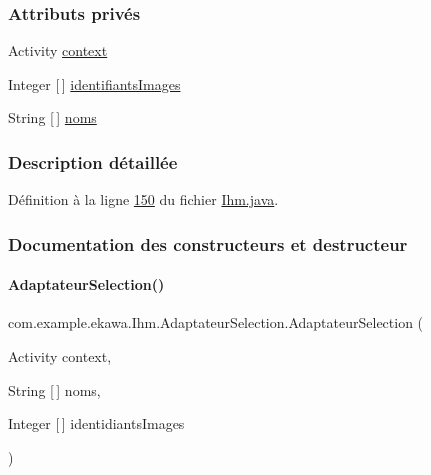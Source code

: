 \subsubsection*{Attributs privés}
\begin{DoxyCompactItemize}
\item 
Activity \hyperlink{classcom_1_1example_1_1ekawa_1_1_ihm_1_1_adaptateur_selection_a9605d2f9384114fcb57da610a7071676}{context}
\item 
Integer \mbox{[}$\,$\mbox{]} \hyperlink{classcom_1_1example_1_1ekawa_1_1_ihm_1_1_adaptateur_selection_ac242f0e242c82c556fb9bba16a5207d1}{identifiants\+Images}
\item 
String \mbox{[}$\,$\mbox{]} \hyperlink{classcom_1_1example_1_1ekawa_1_1_ihm_1_1_adaptateur_selection_a5d71a6dd60ad53aa95ae59bb094b4002}{noms}
\end{DoxyCompactItemize}


\subsubsection{Description détaillée}


Définition à la ligne \hyperlink{_ihm_8java_source_l00150}{150} du fichier \hyperlink{_ihm_8java_source}{Ihm.\+java}.



\subsubsection{Documentation des constructeurs et destructeur}
\mbox{\label{classcom_1_1example_1_1ekawa_1_1_ihm_1_1_adaptateur_selection_a41746ec1a290651b4cacb0894a32307b}} 
\paragraph{\texorpdfstring{Adaptateur\+Selection()}{AdaptateurSelection()}}
{\footnotesize\ttfamily com.\+example.\+ekawa.\+Ihm.\+Adaptateur\+Selection.\+Adaptateur\+Selection (\begin{DoxyParamCaption}\item[{Activity}]{context,  }\item[{String \mbox{[}$\,$\mbox{]}}]{noms,  }\item[{Integer \mbox{[}$\,$\mbox{]}}]{identidiants\+Images }\end{DoxyParamCaption})}



